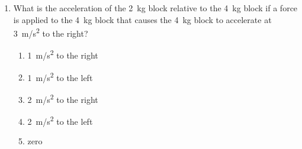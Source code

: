 \documentclass{../../oss-apphys}
\begin{document}
\begin{multicols}{2}
\begin{enumerate}[resume,leftmargin=18pt]
  \item What is the acceleration of the \SI{2}{\kilo\gram} block relative to the
    \SI{4}{\kilo\gram} block if a force is applied to the \SI{4}{\kilo\gram}
    block that causes the \SI{4}{\kilo\gram} block to accelerate at
    \SI{3}{m/s^2} to the right?
    \begin{enumerate}[noitemsep,topsep=0pt,leftmargin=18pt,label=(\Alph*)]
    \item\SI{1}{m/s^2} to the right
    \item\SI{1}{m/s^2} to the left
    \item\SI{2}{m/s^2} to the right
    \item\SI{2}{m/s^2} to the left
    \item zero
    \end{enumerate}
  \end{enumerate}
\end{multicols}
\end{document}
